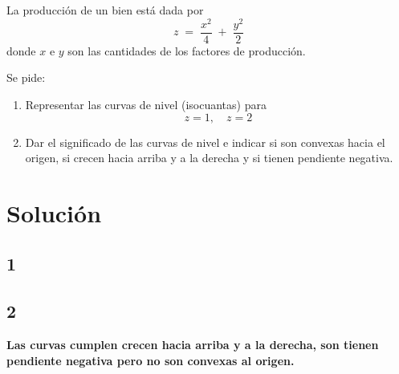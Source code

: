 \documentclass{article}
\begin{document}
La producción de un bien está dada por
\[
z \;=\; \frac{x^2}{4} \;+\; \frac{y^2}{2}
\]
donde \(x\) e \(y\) son las cantidades de los factores de producción.

\medskip

Se pide:
\begin{enumerate}
  \item Representar las curvas de nivel (isocuantas) para
  \[
    z = 1,\quad z = 2
  \]
  \item Dar el significado de las curvas de nivel e indicar si son convexas hacia el origen, si crecen hacia arriba y a la derecha y si tienen pendiente negativa.
\end{enumerate}



\newpage
\section*{Solución}
\subsection*{1}

\begin{center}
\end{center}

\subsection*{2}
\textbf{\color{teal}Las curvas cumplen crecen hacia arriba y a la derecha, son tienen pendiente negativa pero no son convexas al origen.
}
\end{document}
